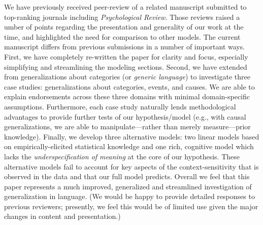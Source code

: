 \documentclass[11pt,letterpaper]{letter} %
\begin{document}
\begin{letter}
We have previously received peer-review of a related manuscript submitted to top-ranking journals including \emph{Psychological Review}.
Those reviews raised a umber of points regarding the presentation and generality of our work at the time, and highlighted the need for comparison to other models. 
The current manuscript differs from previous submissions in a number of important ways.
First, we have completely re-written the paper for clarity and focus, especially simplifying and streamlining the modeling sections.
Second, we have extended from generalizations about categories (or \emph{generic language}) to investigate three case studies: generalizations about categories, events, and causes.
We are able to explain endorsements across these three domains with minimal domain-specific assumptions. 
Furthermore, each case study naturally lends methodological advantages to provide further tests of our hypothesis/model (e.g., with causal generalizations, we are able to manipulate---rather than merely measure---prior knowledge).
Finally, we develop three alternative models: two linear models based on empirically-elicited statistical knowledge and one rich, cognitive model which lacks the \emph{underspecification of meaning} at the core of our hypothesis. 
These alternative models fail to account for key aspects of the context-sensitivity that is observed in the data and that our full model predicts.
Overall we feel that this paper represents a much improved, generalized and streamlined investigation of generalization in language.
(We would be happy to provide detailed responses to previous reviewers; presently, we feel this would be of limited use given the major changes in content and presentation.)




\end{letter}
\end{document}
